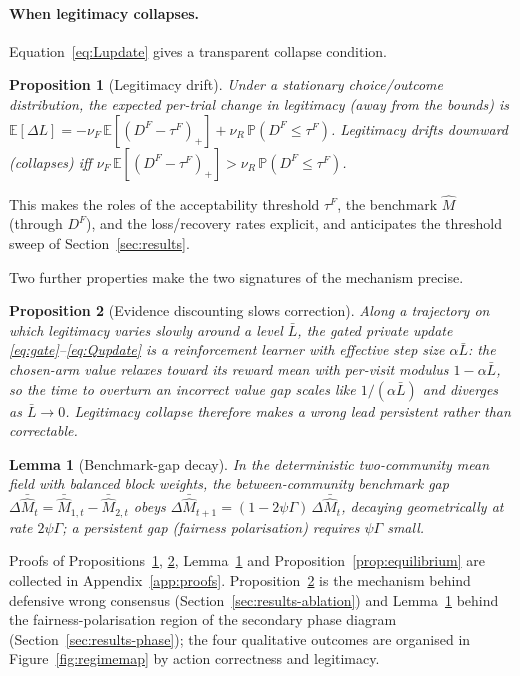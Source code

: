 \documentclass[11pt]{article}
\newtheorem{proposition}{Proposition}
\newtheorem{lemma}{Lemma}
\newcommand{\E}{\mathbb{E}}
\newcommand{\Prob}{\mathbb{P}}
\newcommand{\1}{\mathbf{1}}
\begin{document}
\paragraph{When legitimacy collapses.}
Equation~\eqref{eq:Lupdate} gives a transparent collapse condition.
\begin{proposition}[Legitimacy drift]
\label{prop:drift}
Under a stationary choice/outcome distribution, the expected per-trial change in
legitimacy (away from the bounds) is
$\E[\Delta L]=-\nu_F\,\E[(D^F-\tau^F)_+]+\nu_R\,\Prob(D^F\le\tau^F)$. Legitimacy
drifts downward (collapses) iff
$\nu_F\,\E[(D^F-\tau^F)_+] > \nu_R\,\Prob(D^F\le\tau^F)$.
\end{proposition}
\noindent This makes the roles of the acceptability threshold $\tau^F$, the
benchmark $\hat M$ (through $D^F$), and the loss/recovery rates explicit, and
anticipates the threshold sweep of Section~\ref{sec:results}.

Two further properties make the two signatures of the mechanism precise.

\begin{proposition}[Evidence discounting slows correction]
\label{prop:slowdown}
Along a trajectory on which legitimacy varies slowly around a level $\bar L$, the
gated private update \eqref{eq:gate}--\eqref{eq:Qupdate} is a reinforcement
learner with effective step size $\alpha\bar L$: the chosen-arm value relaxes
toward its reward mean with per-visit modulus $1-\alpha\bar L$, so the time to
overturn an incorrect value gap scales like $1/(\alpha\bar L)$ and diverges as
$\bar L\to0$. Legitimacy collapse therefore makes a wrong lead persistent rather
than correctable.
\end{proposition}
\begin{lemma}[Benchmark-gap decay]
\label{lem:gap}
In the deterministic two-community mean field with balanced block weights, the
between-community benchmark gap
$\Delta\bar{\hat M}_t=\bar{\hat M}_{1,t}-\bar{\hat M}_{2,t}$ obeys
$\Delta\bar{\hat M}_{t+1}=(1-2\psi\Gamma)\,\Delta\bar{\hat M}_t$, decaying
geometrically at rate $2\psi\Gamma$; a persistent gap (fairness polarisation)
requires $\psi\Gamma$ small.
\end{lemma}

\noindent Proofs of Propositions~\ref{prop:drift}, \ref{prop:slowdown},
Lemma~\ref{lem:gap} and Proposition~\ref{prop:equilibrium} are collected in
Appendix~\ref{app:proofs}. Proposition~\ref{prop:slowdown} is the mechanism behind defensive wrong
consensus (Section~\ref{sec:results-ablation}) and Lemma~\ref{lem:gap} behind the
fairness-polarisation region of the secondary phase diagram
(Section~\ref{sec:results-phase}); the four qualitative outcomes are organised in
Figure~\ref{fig:regimemap} by action correctness and legitimacy.
\end{document}
